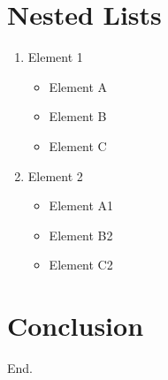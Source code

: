 \documentclass{article}
\begin{document}
    \section{Nested Lists}
        \begin{enumerate}
            \item Element 1
            \begin{itemize}
                \item Element A
                \item Element B
                \item Element C
            \end{itemize}
            \item Element 2
            \begin{itemize}
                \item Element A1
                \item Element B2
                \item Element C2
            \end{itemize}
        \end{enumerate}

    \section{Conclusion}
        End.
\end{document}
